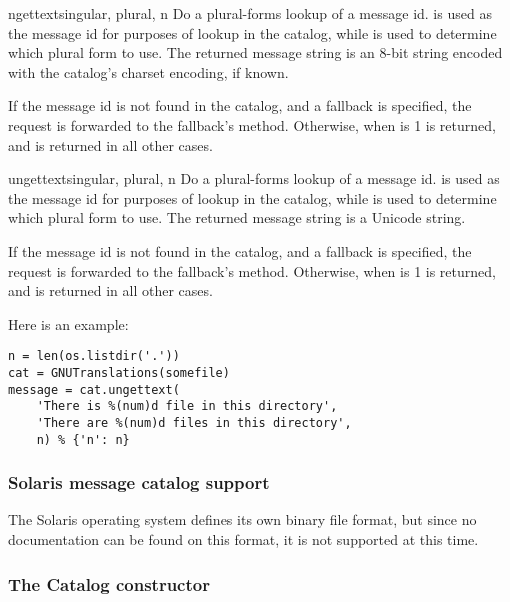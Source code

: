 \begin{methoddesc}[GNUTranslations]{ngettext}{singular, plural, n}
Do a plural-forms lookup of a message id.   is used as
the message id for purposes of lookup in the catalog, while  is
used to determine which plural form to use.  The returned message
string is an 8-bit string encoded with the catalog's charset encoding,
if known.

If the message id is not found in the catalog, and a fallback is
specified, the request is forwarded to the fallback's
 method.  Otherwise, when  is 1  is
returned, and  is returned in all other cases.

\end{methoddesc}

\begin{methoddesc}[GNUTranslations]{ungettext}{singular, plural, n}
Do a plural-forms lookup of a message id.   is used as
the message id for purposes of lookup in the catalog, while  is
used to determine which plural form to use.  The returned message
string is a Unicode string.

If the message id is not found in the catalog, and a fallback is
specified, the request is forwarded to the fallback's
 method.  Otherwise, when  is 1  is
returned, and  is returned in all other cases.

Here is an example:

\begin{verbatim}
n = len(os.listdir('.'))
cat = GNUTranslations(somefile)
message = cat.ungettext(
    'There is %(num)d file in this directory',
    'There are %(num)d files in this directory',
    n) % {'n': n}
\end{verbatim}

\end{methoddesc}

\subsubsection{Solaris message catalog support}

The Solaris operating system defines its own binary
 file format, but since no documentation can be found on
this format, it is not supported at this time.

\subsubsection{The Catalog constructor}

